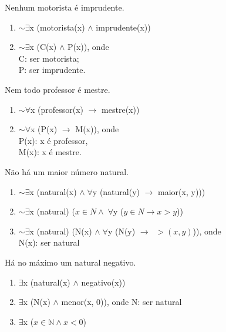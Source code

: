 \bigskip
\begin{exemplo} Nenhum motorista é imprudente.
\end{exemplo}

\begin{enumerate}[label=(\roman*)]
    \item $\sim \exists$x (motorista(x) $\wedge$ imprudente(x))
    \item $\sim \exists$x (C(x) $\wedge$ P(x)), onde\\
    C: ser motorista;\\
    P: ser imprudente.
\end{enumerate}

\bigskip
\begin{exemplo} Nem todo professor é mestre.
\end{exemplo}

\begin{enumerate}[label=(\roman*)]
    \item $\sim \forall$x (professor(x) $\to$ mestre(x))
    \item $\sim \forall$x (P(x) $\to$ M(x)), onde\\
    P(x): x é professor,
    \\M(x): x é mestre.
\end{enumerate}

\bigskip
\begin{exemplo} Não há um maior número natural.
\end{exemplo}

\begin{enumerate}[label=(\roman*)]
    \item $\sim \exists$x (natural(x) $\wedge \; \forall$y (natural(y) $\to$ maior(x, y)))
    \item $\sim \exists$x (natural) ($x \in N \wedge \; \forall$y ($y \in N \to x > y$))
    \item $\sim \exists$x (natural) (N(x) $\wedge \; \forall$y (N(y) $\to \;\; > (x, y)$)), onde\\
    N(x): ser natural
\end{enumerate}

\bigskip
\begin{exemplo} Há no máximo um natural negativo.
\end{exemplo}

\begin{enumerate}[label=(\roman*)]
    \item \underline{$\exists$}x (natural(x) $\wedge$ negativo(x))
    \item \underline{$\exists$}x (N(x) $\wedge$ menor(x, 0)), onde N: ser natural
    \item \underline{$\exists$}x ($x \in \mathbb{N} \wedge x < 0$)
\end{enumerate}

